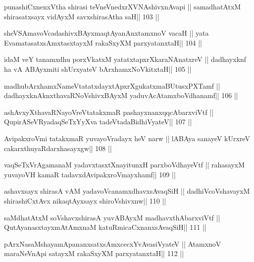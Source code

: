 \begin{shl}
punashiCxnenxV\s tha shirasi teVneVnedxrXVNAshivxnAvapi ||
samadhatAtxM shirasatxsayx vidAyxM savxshirasA\s tha saH\hfill || 103 ||
\end{shl}

\begin{shl}
sheVSAmavoVcadashivxBAyxmaqtAyanAnxtamxnoV vacaH ||
yata EvamatasatxsAmxtasxtayxM rakaSxyXM parxyatanxtaH\hfill || 104 ||
\end{shl}

\begin{shl}
idaM veY tanamxdhu porxVkatxM yatatxtapxrXkaraNAnatxreV ||
dadhayxknf ha vA ABAyxmiti shUrxyateV bArxhamxNoVkitxtaH\hfill || 105 ||
\end{shl}

\begin{shl}
madhubArxhamxNameVtatatxdayxtApxrXgukatxmaBUtusxPXTamf ||
dadhayxknAknxthavaRNoV\s shivxBAyxM yaduvAcA\s\s tamxboVdhanamf\hfill || 106 ||
\end{shl}

\begin{shl}
ashAvxyXthavaRNayoVreVtatakxmaR pashayxnanxqqcA\s barxviVtf ||
QupirASeVRyadaqSeTxYyXva tadeVtadaBidhiVyateV\hfill || 107 ||
\end{shl}

\begin{shl}
AvipakxroVmi tatakxmaR yuvayoVradayx heV narw ||
lABAya sanayeV kUrxreV cakarxthuyaRdarxhasayxgw\hfill || 108 ||
\end{shl}

\begin{shl}
vaqSeTxVrAgamanaM yadavxtasxtXnayitunxH parxboVdhayeVtf ||
rahasayxM yuvayoVH kamaR tadavxdAvipakxroVmayxhamf\hfill || 109 ||
\end{shl}

\begin{shl}
ashavxsayx shirasA vAM yadavoVcanamxdhavxsAvaqSiH ||
dadhiVcoV\s shavayxM shirashiCxtAvx nikaqtAyxsayx shiroV\s shivxnw\hfill || 110 ||
\end{shl}

\begin{shl}
saMdhatAtxM soV\s shavxshirasA yuvABAyxM madhavxthAbarxviVtf ||
QutAyanasxtayxmAtAmxnaM katuRmicaCxnanxsAvaqSiH\hfill || 111 ||
\end{shl}

\begin{shl}
pArxNasaMshayamApananxsatxsAmxcecxYvAvasiVyateV ||
AtamxnoV maraNeVnApi satayxM rakaSxyXM parxyatanxtaH\hfill || 112 ||
\end{shl}

